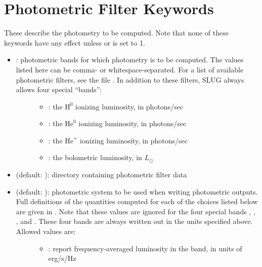\documentclass[letterpaper,10pt,english]{sphinxmanual}
\begin{document}
\section{Photometric Filter Keywords}
\label{\detokenize{parameters:ssec-phot-keywords}}\label{\detokenize{parameters:photometric-filter-keywords}}
These describe the photometry to be computed. Note that none of these keywords have any effect unless  or  is set to 1.
\begin{itemize}
\item {} \begin{description}
\item[{: photometric bands for which photometry is to be computed. The values listed here can be comma- or whitespace-separated. For a list of available photometric filters, see the file . In addition to these filters, SLUG always allows four special “bands”:}] \leavevmode\begin{itemize}
\item {} 
: the \(\mathrm{H}^0\) ionizing luminosity, in photons/sec

\item {} 
: the \(\mathrm{He}^0\) ionizing luminosity, in photons/sec

\item {} 
: the \(\mathrm{He}^+\) ionizing luminosity, in photons/sec

\item {} 
: the bolometric luminosity, in \(L_\odot\)

\end{itemize}

\end{description}

\item {} 
 (default: ): directory containing photometric filter data

\item {} \begin{description}
\item[{ (default: ): photometric system to be used when writing photometric outputs. Full definitions of the quantities computed for each of the choices listed below are given in {\hyperref[\detokenize{intro:ssec-spec-phot}]{}}. Note that these values are ignored for the four special bands , , , and . These four bands are always written out in the units specified above. Allowed values are:}] \leavevmode\begin{itemize}
\item {} 
: report frequency-averaged luminosity in the band, in units of erg/s/Hz


\end{itemize}
\end{description}
\end{itemize}
\end{document}
